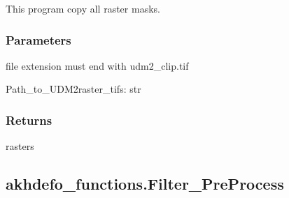 \documentclass[letterpaper,10pt]{sphinxmanual}
\begin{document}
\begin{fulllineitems}
\label{\detokenize{generated/akhdefo_functions.copyUDM2_Mask_Data:akhdefo_functions.copyUDM2_Mask_Data}}
\pysigstartsignatures
{}
\pysigstopsignatures
\sphinxAtStartPar
This program copy all  raster masks.


\subsubsection{Parameters}
\label{\detokenize{generated/akhdefo_functions.copyUDM2_Mask_Data:parameters}}\begin{description}
\sphinxAtStartPar
file extension must end with udm2\_clip.tif

\end{description}

\sphinxAtStartPar
Path\_to\_UDM2raster\_tifs: str


\subsubsection{Returns}
\label{\detokenize{generated/akhdefo_functions.copyUDM2_Mask_Data:returns}}
\sphinxAtStartPar
rasters

\end{fulllineitems}


\sphinxstepscope


\subsection{akhdefo\_functions.Filter\_PreProcess}
\label{\detokenize{generated/akhdefo_functions.Filter_PreProcess:akhdefo-functions-filter-preprocess}}\label{\detokenize{generated/akhdefo_functions.Filter_PreProcess::doc}}
\end{document}

